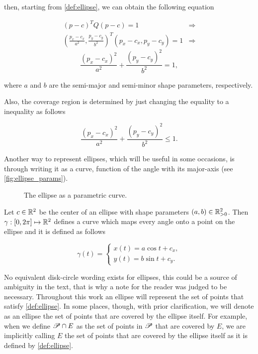 \noindent then, starting from \autoref{def:ellipse}, we can obtain the following equation

\begin{align*}
        (p-c)^{T}Q(p-c) = 1 & \Rightarrow \\
    (\frac{p_x-c_x}{a^2}, \frac{p_y-c_y}{b^2})^{T}(p_x-c_x, p_y-c_y) = 1 & \Rightarrow
 \end{align*}
 \begin{equation}\label{equation:pellipse}
  \frac{(p_x-c_x)^2}{a^2} + \frac{(p_y-c_y)^2}{b^2} = 1,
 \end{equation}

\noindent where $a$ and $b$ are the semi-major and semi-minor shape parameters, respectively.

Also, the coverage region is determined by just changing the equality to a inequality as follows

\begin{equation}\label{equation:cover_pellipse}
\frac{(p_x-c_x)^2}{a^2} + \frac{(p_y-c_y)^2}{b^2} \le 1.
\end{equation}

Another way to represent ellipses, which will be useful in some occasions, is through writing it as a curve, function of the angle with its major-axis (see \autoref{fig:ellipse_params}).

\begin{figure}[H]
    \centering
    
    \caption{The ellipse as a parametric curve.}
    
    \fautor
    \label{fig:ellipse_params}
\end{figure}

Let $c \in \mathbb{R}^2$ be the center of an ellipse with shape parameters $(a,b) \in \mathbb{R}^2_{>0}$. Then $\gamma : [0, 2\pi] \mapsto \mathbb{R}^2$ defines a curve which maps every angle onto a point on the ellipse and it is defined as follows

    \begin{equation}\label{eq:parametric_ellipse}
    \gamma(t) = \left\{
    \begin{array}{l}
    x(t)= a\cos{t} + c_x,\\
    y(t)=b\sin{t} + c_y.
    \end{array}
    \right.
    \end{equation}

No equivalent disk-circle wording exists for ellipses, this could be a source of ambiguity in the text, that is why a note for the reader was judged to be necessary. Throughout this work an ellipse will represent the set of points that satisfy \autoref{def:ellipse}. In some places, though, with prior clarification, we will denote as an ellipse the set of points that are covered by the ellipse itself. For example, when we define $\mathscr{P} \cap E$ as the set of points in $\mathscr{P}$ that are covered by $E$, we are implicitly calling $E$ the set of points that are covered by the ellipse itself as it is defined by \autoref{def:ellipse}.